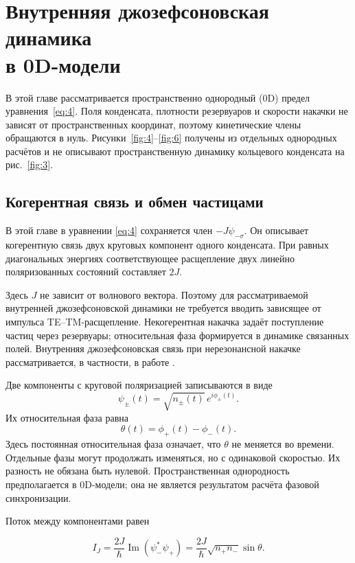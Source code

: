 \documentclass[12pt,a4paper]{article}
\begin{document}
\clearpage
\section[Внутренняя джозефсоновская динамика в 0D-модели]{Внутренняя джозефсоновская динамика\\в 0D-модели}\label{sec:3}

В этой главе рассматривается пространственно однородный (0D) предел уравнения~\eqref{eq:4}. Поля конденсата, плотности резервуаров и скорости накачки не зависят от пространственных координат, поэтому кинетические члены обращаются в нуль. Рисунки~\ref{fig:4}--\ref{fig:6} получены из отдельных однородных расчётов и не описывают пространственную динамику кольцевого конденсата на рис.~\ref{fig:3}.

\subsection{Когерентная связь и обмен частицами}\label{sec:3.1}

В этой главе в уравнении \eqref{eq:4} сохраняется член \(-J\psi_{-\sigma}\). Он описывает когерентную связь двух круговых компонент одного конденсата. При равных диагональных энергиях соответствующее расщепление двух линейно поляризованных состояний составляет \(2J\).

Здесь \(J\) не зависит от волнового вектора. Поэтому для рассматриваемой внутренней джозефсоновской динамики не требуется вводить зависящее от импульса TE–TM-расщепление. Некогерентная накачка задаёт поступление частиц через резервуары; относительная фаза формируется в динамике связанных полей. Внутренняя джозефсоновская связь при нерезонансной накачке рассматривается, в частности, в работе \cite{ref4}.

Две компоненты с круговой поляризацией записываются в виде
\[
\psi_\pm(t)=\sqrt{n_\pm(t)}\,e^{i\phi_\pm(t)}.
\]
Их относительная фаза равна
\[
\theta(t)=\phi_+(t)-\phi_-(t).
\]
Здесь постоянная относительная фаза означает, что \(\theta\) не меняется во времени. Отдельные фазы могут продолжать изменяться, но с одинаковой скоростью. Их разность не обязана быть нулевой. Пространственная однородность предполагается в 0D-модели; она не является результатом расчёта фазовой синхронизации.

Поток между компонентами равен

\begin{equation}\label{eq:9}
I_J
=
\frac{2J}{\hbar}\operatorname{Im}(\psi_-^*\psi_+)
=
\frac{2J}{\hbar}\sqrt{n_+n_-}\sin\theta.
\end{equation}
\end{document}
